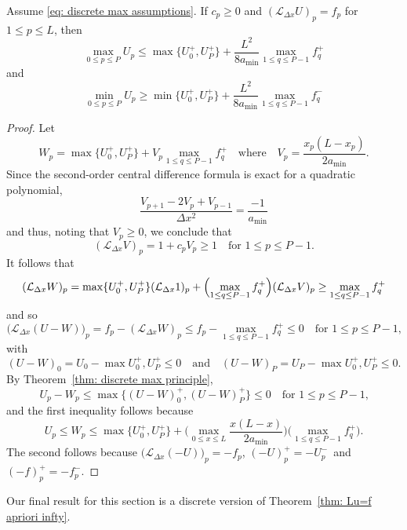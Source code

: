 \begin{theorem}
Assume \eqref{eq: discrete max assumptions}.
If $c_p\ge0$ and $(\mathcal{L}_{\Delta x}U)_p=f_p$ for $1\le p\le L$, then
\[
\max_{0\le p\le P}U_p\le\max\{U^+_0,U^+_P\}+\frac{L^2}{8a_{\min}}
	\max_{1\le q\le P-1}f_q^+
\]
and
\[
\min_{0\le p\le P}U_p\ge\min\{U^+_0,U^+_P\}+\frac{L^2}{8a_{\min}}
	\max_{1\le q\le P-1}f_q^-
\]
\end{theorem}
\begin{proof}
Let 
\[
W_p=\max\{U^+_0,U^+_P\}+V_p\max_{1\le q\le P-1}f_q^+
\quad\text{where}\quad
V_p=\frac{x_p(L-x_p)}{2a_{\min}}.
\]
Since the second-order central difference formula is exact for a quadratic 
polynomial,
\[
\frac{V_{p+1}-2V_p+V_{p-1}}{\Delta x^2}=\frac{-1}{a_{\min}}
\]
and thus, noting that $V_p\ge0$, we conclude that
\[
(\mathcal{L}_{\Delta x}V)_p=1+c_pV_p\ge1\quad\text{for $1\le p\le P-1$.}
\]
It follows that
\[
(\mathcal{L}_{\Delta x}W)_p=\max\{U^+_0,U^+_P\}(\mathcal{L}_{\Delta x}1)_p
	+\Bigl(\max_{1\le q\le P-1}f_q^+\Bigr)(\mathcal{L}_{\Delta x}V)_p
	\ge\max_{1\le q\le P-1}f_q^+
\]
and so
\[
\bigl(\mathcal{L}_{\Delta x}(U-W)\bigr)_p=f_p-(\mathcal{L}_{\Delta x}W)_p
	\le f_p-\max_{1\le q\le P-1}f_q^+\le0\quad\text{for $1\le p\le P-1$,}
\]
with
\[
(U-W)_0=U_0-\max{U_0^+,U_P^+}\le0
\quad\text{and}\quad
(U-W)_P=U_P-\max{U_0^+,U_P^+}\le0.
\]
By Theorem~\ref{thm: discrete max principle},
\[
U_p-W_p\le\max\{(U-W)_0^+,(U-W)_P^+\}\le0\quad\text{for $1\le p\le P-1$,}
\]
and the first inequality follows because
\[
U_p\le W_p\le\max\{U^+_0,U^+_P\}
	+\biggl(\max_{0\le x\le L}\frac{x(L-x)}{2a_{\min}}\biggr)
	\biggl(\max_{1\le q\le P-1}f_q^+\biggr). 
\]
The second follows because $\bigl(\mathcal{L}_{\Delta x}(-U)\bigr)_p=-f_p$,
$(-U)_p^+=-U_p^-$~and $(-f)_p^+=-f_p^-$.
\end{proof}

Our final result for this section is a discrete version of 
Theorem~\ref{thm: Lu=f apriori infty}.

